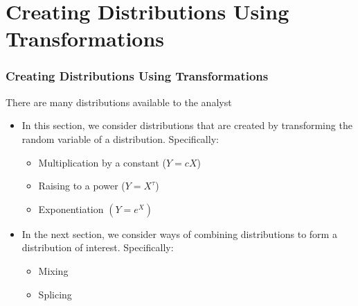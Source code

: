 \documentclass{beamer}
\begin{document}
\section{Creating Distributions Using Transformations}


\begin{frame}[shrink=2]
\frametitle{Creating Distributions Using Transformations} There are
many distributions available to the analyst \vspace{2mm}

\begin{itemize}
\item In this section, we consider distributions that are created by transforming the random variable of a distribution.
Specifically: \vspace{2mm}

\begin{itemize}
\item  Multiplication by a constant ($Y = cX$) \\
\item Raising to a power ($Y = X^\tau$)\\
\item Exponentiation $(Y = e^X)$\\
\end{itemize}\vspace{2mm}

\item In the next section, we consider ways of combining distributions to form a distribution of interest. Specifically: \vspace{2mm}

\begin{itemize}
\item Mixing
\item Splicing
\end{itemize}\end{itemize}
\end{frame}
\end{document}
